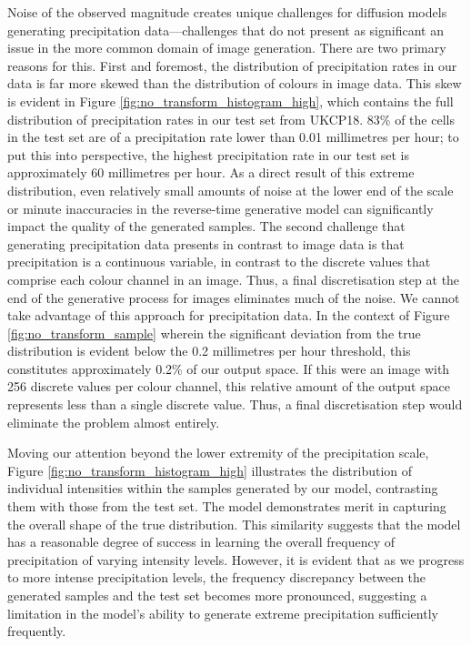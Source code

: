 \documentclass[ oneside,%
                    author={George Herbert},
                    degree={MSci},
                     title={Diffusion Models for Time-Evolving Precipitation Fields},
                  subtitle={}]{dissertation}
\begin{document}
Noise of the observed magnitude creates unique challenges for diffusion models generating precipitation data---challenges that do not present as significant an issue in the more common domain of image generation. There are two primary reasons for this. First and foremost, the distribution of precipitation rates in our data is far more skewed than the distribution of colours in image data. This skew is evident in Figure \ref{fig:no_transform_histogram_high}, which contains the full distribution of precipitation rates in our test set from UKCP18. 83\% of the cells in the test set are of a precipitation rate lower than 0.01 millimetres per hour; to put this into perspective, the highest precipitation rate in our test set is approximately 60 millimetres per hour. As a direct result of this extreme distribution, even relatively small amounts of noise at the lower end of the scale or minute inaccuracies in the reverse-time generative model can significantly impact the quality of the generated samples. The second challenge that generating precipitation data presents in contrast to image data is that precipitation is a continuous variable, in contrast to the discrete values that comprise each colour channel in an image. Thus, a final discretisation step at the end of the generative process for images eliminates much of the noise. We cannot take advantage of this approach for precipitation data. In the context of Figure \ref{fig:no_transform_sample} wherein the significant deviation from the true distribution is evident below the 0.2 millimetres per hour threshold, this constitutes approximately 0.2\% of our output space. If this were an image with 256 discrete values per colour channel, this relative amount of the output space represents less than a single discrete value. Thus, a final discretisation step would eliminate the problem almost entirely.

Moving our attention beyond the lower extremity of the precipitation scale, Figure \ref{fig:no_transform_histogram_high} illustrates the distribution of individual intensities within the samples generated by our model, contrasting them with those from the test set. The model demonstrates merit in capturing the overall shape of the true distribution. This similarity suggests that the model has a reasonable degree of success in learning the overall frequency of precipitation of varying intensity levels. However, it is evident that as we progress to more intense precipitation levels, the frequency discrepancy between the generated samples and the test set becomes more pronounced, suggesting a limitation in the model's ability to generate extreme precipitation sufficiently frequently.
\end{document}

